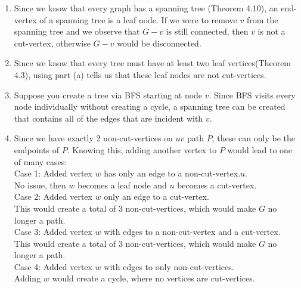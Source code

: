 \documentclass[10pt,a4paper]{article}
\begin{document}
\begin{enumerate} [label=\alph*)]
\item Since we know that every graph has a spanning tree (Theorem 4.10), an end-vertex of a spanning tree is a leaf node. If we were to remove $v$ from the spanning tree and we observe that $G - v$ is still connected, then $v$ is not a cut-vertex, otherwise $G - v$ would be disconnected.\\
\item Since we know that every tree must have at least two leaf vertices(Theorem 4.3), using part (a) tells us that these leaf nodes are not cut-vertices.\\
\item Suppose you create a tree via BFS starting at node $v$. Since BFS visits every node individually without creating a cycle, a spanning tree can be created that contains all of the edges that are incident with $v$.\\
\item Since we have exactly 2 non-cut-vertices on $uv$ path $P$, these can only be the endpoints of $P$. Knowing this, adding another vertex to $P$ would lead to one of many cases:\\
Case 1: Added vertex $w$ has only an edge to a non-cut-vertex.$u$.\\
No issue, then $w$ becomes a leaf node and $u$ becomes a cut-vertex.\\
Case 2: Added vertex $w$ only an edge to a cut-vertex.\\
This would create a total of 3 non-cut-vertices, which would make $G$ no longer a path.\\
Case 3: Added vertex $w$ with edges to a non-cut-vertex and a cut-vertex.\\
This would create a total of 3 non-cut-vertices, which would make $G$ no longer a path.\\
Case 4: Added vertex $w$ with edges to only non-cut-vertices.\\
Adding $w$ would create a cycle, where no vertices are cut-vertices.\\
\end{enumerate}
\end{document}

